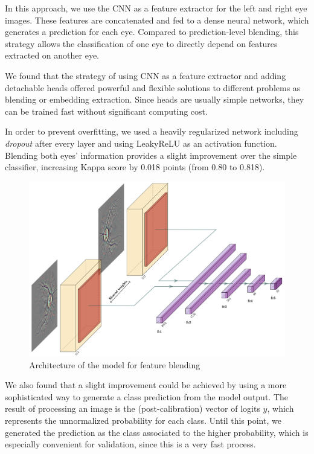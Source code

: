In this approach, we use the CNN as a feature extractor for the left and right eye images. These features are concatenated and fed to a dense neural network, which generates a prediction for each eye. Compared to prediction-level blending, this strategy allows the classification of one eye to directly depend on features extracted on another eye.

We found that the strategy of using CNN as a feature extractor and adding detachable heads offered powerful and flexible solutions to different problems as blending or embedding extraction. Since heads are usually simple networks, they can be trained fast without significant computing cost.

In order to prevent overfitting, we used a heavily regularized network including \textit{dropout} after every layer and using LeakyReLU as an activation function. Blending both eyes' information provides a slight improvement over the simple classifier, increasing Kappa score by 0.018 points (from 0.80 to 0.818).

\begin{figure}[tb]
    \centering
    \includegraphics[scale=0.35]{figures/chapter5/models/blended_model.png}
    \caption{Architecture of the model for feature blending}
    \label{fig:blended_model}
\end{figure}

We also found that a slight improvement could be achieved by using a more sophisticated way to generate a class prediction from the model output. The result of processing an image is the (post-calibration) vector of logits \( y \), which represents the unnormalized probability for each class. Until this point, we generated the prediction as the class associated to the higher probability, which is especially convenient for validation, since this is a very fast process.

